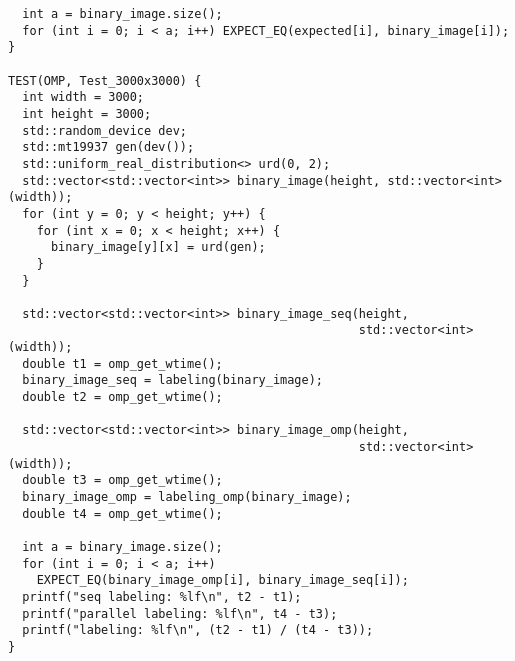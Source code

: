 \documentclass[12pt]{article}
\begin{document}
\begin{lstlisting}
  int a = binary_image.size();
  for (int i = 0; i < a; i++) EXPECT_EQ(expected[i], binary_image[i]);
}

TEST(OMP, Test_3000x3000) {
  int width = 3000;
  int height = 3000;
  std::random_device dev;
  std::mt19937 gen(dev());
  std::uniform_real_distribution<> urd(0, 2);
  std::vector<std::vector<int>> binary_image(height, std::vector<int>(width));
  for (int y = 0; y < height; y++) {
    for (int x = 0; x < height; x++) {
      binary_image[y][x] = urd(gen);
    }
  }

  std::vector<std::vector<int>> binary_image_seq(height,
                                                 std::vector<int>(width));
  double t1 = omp_get_wtime();
  binary_image_seq = labeling(binary_image);
  double t2 = omp_get_wtime();

  std::vector<std::vector<int>> binary_image_omp(height,
                                                 std::vector<int>(width));
  double t3 = omp_get_wtime();
  binary_image_omp = labeling_omp(binary_image);
  double t4 = omp_get_wtime();

  int a = binary_image.size();
  for (int i = 0; i < a; i++)
    EXPECT_EQ(binary_image_omp[i], binary_image_seq[i]);
  printf("seq labeling: %lf\n", t2 - t1);
  printf("parallel labeling: %lf\n", t4 - t3);
  printf("labeling: %lf\n", (t2 - t1) / (t4 - t3));
}
\end{lstlisting}
\end{document}
